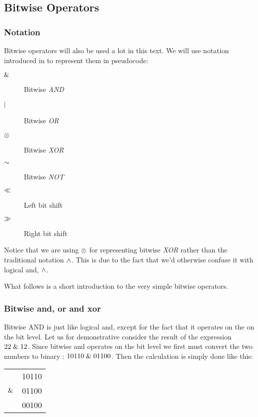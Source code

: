 \subsection{Bitwise Operators}
\label{sec:bitwise-operators}

\subsubsection{Notation}

Bitwise operators will also be used a lot in this text. We will use
notation introduced in \C{}\cite{kernighan1988c} to represent them in
pseudocode:

\begin{description}
\item[$\mathrel{\&}$] Bitwise \textit{AND}
\item[$\mathrel{|}$] Bitwise \textit{OR}
\item[$\mathrel{\otimes}$] Bitwise \textit{XOR}
\item[$\mathord{\sim}$] Bitwise \textit{NOT}
\item[$\ll$] Left bit shift
\item[$\gg$] Right bit shift
\end{description}

Notice that we are using $\mathrel{\otimes}$ for representing bitwise
\textit{XOR} rather than the traditional \C notation $\wedge$. This is due to
the fact that we'd otherwise confuse it with logical and, $\wedge$.

What follows is a short introduction to the very simple bitwise
operators.

\subsubsection{Bitwise and, or and xor}

Bitwise AND is just like logical and, except for the fact that it
operates on the on the bit level. Let us for demonstrative consider
the result of the expression $22 \mathrel{\&} 12$. Since bitwise and
operates on the bit level we first must convert the two numbers to
binary : $10110 \mathrel{\&} 01100$. Then the calculation is simply done
like this:

\begin{center}
  \begin{tabular}{lr}
    & 10110  \\
    $\mathrel{\&}$ & 01100 \\
    \hline
    & 00100 \\
  \end{tabular}
\end{center}

